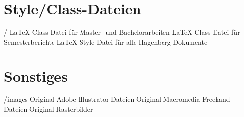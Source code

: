 \section{Style/Class-Dateien}

\begin{FileList}{/}
 LaTeX Class-Datei für Master- und Bachelorarbeiten
 LaTeX Class-Datei für Semesterberichte
 LaTeX Style-Datei für alle Hagenberg-Dokumente
\end{FileList}


\section{Sonstiges}

\begin{FileList}{/images}
 Original Adobe Illustrator-Dateien %
 Original Macromedia Freehand-Dateien %
 Original Rasterbilder %
\end{FileList}
